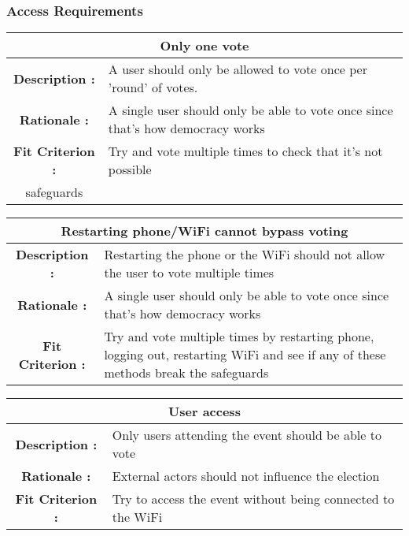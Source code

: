 \documentclass[12pt, titlepage]{article}
\begin{document}
\subsubsection{Access Requirements}

\begin{center}
\begin{table}[H]
\begin{tabularx}{\textwidth}{| c X |}
\hline
\multicolumn{2}{|c|}{\textbf{Only one vote}}\\
\hline
\textbf{Description : } & A user should only be allowed to vote once per 'round'
of votes.\\
\hline
\textbf{Rationale : } & A single user should only be able to vote once since
that's how democracy works\\
\hline
\textbf{Fit Criterion : } & Try and vote multiple times to check that it's not
possible\\
safeguards\\
\hline
\end{tabularx}
\end{table}
\end{center}

\begin{center}
\begin{table}[H]
\begin{tabularx}{\textwidth}{| c X |}
\hline
\multicolumn{2}{|c|}{\textbf{Restarting phone/WiFi cannot bypass voting}}\\
\hline
\textbf{Description : } & Restarting the phone or the WiFi should not allow
the user to vote multiple times\\
\hline
\textbf{Rationale : } & A single user should only be able to vote once since
that's how democracy works\\
\hline
\textbf{Fit Criterion : } & Try and vote multiple times by restarting phone,
logging out, restarting WiFi and see if any of these methods break the
safeguards\\
\hline
\end{tabularx}
\end{table}
\end{center}

\begin{center}
\begin{table}[H]
\begin{tabularx}{\textwidth}{| c X |}
\hline
\multicolumn{2}{|c|}{\textbf{User access}}\\
\hline
\textbf{Description : } & Only users attending the event should be able to vote\\
\hline
\textbf{Rationale : } & External actors should not influence the election\\
\hline
\textbf{Fit Criterion : } & Try to access the event without being connected to
the WiFi\\
\hline
\end{tabularx}
\end{table}
\end{center}
\end{document}
